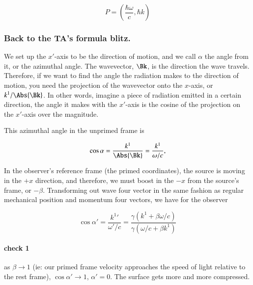 \begin{equation}\label{eqn:relativisticElectrodynamicsT1:136}
P = \left( \frac{\hbar \omega}{c}, \hbar k \right)
\end{equation}

\subsubsection{Back to the TA's formula blitz.}

We set up the $x'$-axis to be the direction of motion, and we call $\alpha$ the angle from it, or the azimuthal angle.  The wavevector, $\Bk$, is the direction the wave travels. Therefore, if we want to find the angle the radiation makes to the direction of motion, you need the projection of the wavevector onto the $x$-axis, or $k^1/\Abs{\Bk}$. In other words, imagine a piece of radiation emitted in a certain direction, the angle it makes with the $x'$-axis is the cosine of the projection on the $x'$-axis over the magnitude.

This azimuthal angle in the unprimed frame is

\begin{equation}\label{eqn:relativisticElectrodynamicsT1:140} 
\cos \alpha = \frac{k^1}{\Abs{\Bk}} = \frac{k^1}{\omega/c},
\end{equation}

In the observer's reference frame (the primed coordinates), the source is moving in the $+x$ direction, and therefore, we must boost in the $-x$ from the source's frame, or $-\beta$.  Transforming out wave four vector in the same fashion as regular mechanical position and momentum four vectors, we have for the observer

\begin{equation}\label{eqn:relativisticElectrodynamicsT1:140b} 
\cos \alpha' = \frac{{k^1}'}{\omega'/c} = \frac{\gamma (k^1 + \beta \omega/c)}{\gamma(\omega/c + \beta k^1)}
\end{equation}


\paragraph{check 1}

as $\beta \rightarrow 1$ (ie: our primed frame velocity approaches the speed of light relative to the rest frame), $\cos \alpha' \rightarrow 1$, $\alpha' = 0$.  The surface gets more and more compressed.

